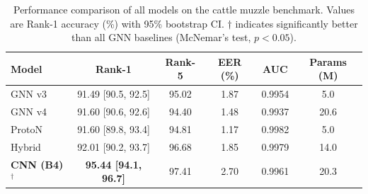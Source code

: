
\begin{table}[htbp]
\centering
\caption{Performance comparison of all models on the cattle muzzle benchmark.
         Values are Rank-1 accuracy (\%) with 95\% bootstrap CI.
         $\dagger$ indicates significantly better than all GNN baselines
         (McNemar's test, $p < 0.05$).}
\label{tab:main_results}
\begin{tabular}{lccccc}
\toprule
\textbf{Model} & \textbf{Rank-1} & \textbf{Rank-5} & \textbf{EER (\%)} & \textbf{AUC} & \textbf{Params (M)} \\
\midrule
  GNN v3 & 91.49 [90.5, 92.5] & 95.02 & 1.87 & 0.9954 & 5.0 \\
  GNN v4 & 91.60 [90.6, 92.6] & 94.40 & 1.48 & 0.9937 & 20.6 \\
  ProtoN & 91.60 [89.8, 93.4] & 94.81 & 1.17 & 0.9982 & 5.0 \\
  Hybrid & 92.01 [90.2, 93.7] & 96.68 & 1.85 & 0.9979 & 14.0 \\
  \textbf{CNN (B4)$^\dagger$} & \textbf{95.44 [94.1, 96.7]} & 97.41 & 2.70 & 0.9961 & 20.3 \\

\bottomrule
\end{tabular}
\end{table}
